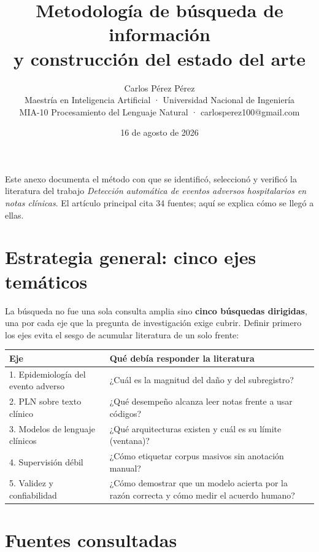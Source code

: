 \documentclass[11pt,a4paper]{article}
\title{\color{granate}\textbf{Metodología de búsqueda de información\\y construcción del estado del arte}}
\author{Carlos Pérez Pérez\\
\small Maestría en Inteligencia Artificial · Universidad Nacional de Ingeniería\\
\small MIA-10 Procesamiento del Lenguaje Natural · carlosperez100@gmail.com}
\date{16 de agosto de 2026}
\begin{document}
\maketitle

\noindent Este anexo documenta el método con que se identificó, seleccionó y
verificó la literatura del trabajo \emph{Detección automática de eventos
adversos hospitalarios en notas clínicas}. El artículo principal cita 34
fuentes; aquí se explica cómo se llegó a ellas.

\section{Estrategia general: cinco ejes temáticos}

La búsqueda no fue una sola consulta amplia sino \textbf{cinco búsquedas
dirigidas}, una por cada eje que la pregunta de investigación exige cubrir.
Definir primero los ejes evita el sesgo de acumular literatura de un solo
frente:

\begin{center}
\begin{tabular}{@{}p{4.6cm}p{9.6cm}@{}}
\toprule
\textbf{Eje} & \textbf{Qué debía responder la literatura} \\
\midrule
1. Epidemiología del evento adverso & ¿Cuál es la magnitud del daño y del subregistro? \\
2. PLN sobre texto clínico & ¿Qué desempeño alcanza leer notas frente a usar códigos? \\
3. Modelos de lenguaje clínicos & ¿Qué arquitecturas existen y cuál es su límite (ventana)? \\
4. Supervisión débil & ¿Cómo etiquetar corpus masivos sin anotación manual? \\
5. Validez y confiabilidad & ¿Cómo demostrar que un modelo acierta por la razón correcta y cómo medir el acuerdo humano? \\
\bottomrule
\end{tabular}
\end{center}

\section{Fuentes consultadas}
\end{document}
